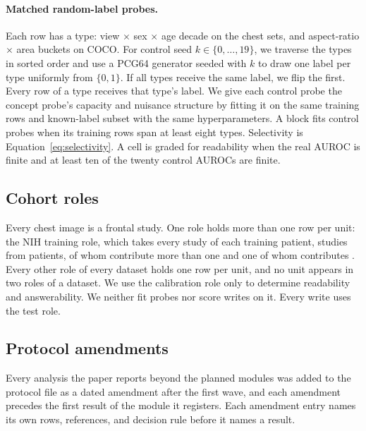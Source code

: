 \paragraph{Matched random-label probes.} Each row has a type: view $\times$ sex $\times$ age decade on the chest sets, and aspect-ratio $\times$ area buckets on COCO. For control seed $k\in\{0,\dots,19\}$, we traverse the types in sorted order and use a PCG64 generator seeded with $k$ to draw one label per type uniformly from $\{0,1\}$. If all types receive the same label, we flip the first. Every row of a type receives that type's label. We give each control probe the concept probe's capacity and nuisance structure by fitting it on the same training rows and known-label subset with the same hyperparameters. A block fits control probes when its training rows span at least eight types. Selectivity is Equation~\ref{eq:selectivity}. A cell is graded for readability when the real AUROC is finite and at least ten of the twenty control AUROCs are finite.

\subsection{Cohort roles}
\label{app:repro-cohorts}

Every chest image is a frontal study. One role holds more than one row per unit: the NIH training role, which takes every study of each training patient, \cfCohortNihTrainRows{} studies from \cfCohortNihTrainUnits{} patients, \cfCohortNihTrainMulti{} of whom contribute more than one and one of whom contributes \cfCohortNihTrainMax{}. Every other role of every dataset holds one row per unit, and no unit appears in two roles of a dataset. We use the calibration role only to determine readability and answerability. We neither fit probes nor score writes on it. Every write uses the test role.

\FloatBarrier

\subsection{Protocol amendments}
\label{app:repro-protocol}

Every analysis the paper reports beyond the \cfCoveragePlannedWord{} planned modules was added to the protocol file as a dated amendment after the first wave, and each amendment precedes the first result of the module it registers. Each amendment entry names its own rows, references, and decision rule before it names a result.


